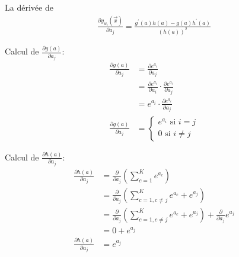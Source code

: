 La dérivée de 
\begin{equation}
\begin{split}
	\frac{\partial y_{w_i}(\overrightarrow{x})} {\partial a_j} = \frac{g^{'}(a) h(a) - g(a) h^{'}(a)} {(h(a))^2}
\end{split}
\end{equation}

Calcul de $ \frac{\partial g(a)} {\partial a_j} $:
\begin{equation}
\begin{split}
	 \frac{\partial g(a)} {\partial a_j} &= \frac{\partial e^{a_i}} {\partial a_j} \\
	 &= \frac{\partial e^{a_i}} {\partial a_i} \cdot \frac{\partial e^{a_i}} {\partial a_j} \\
	 &= e^{a_i} \cdot \frac{\partial e^{a_i}} {\partial a_j} \\
	 \frac{\partial g(a)} {\partial a_j} &= 
	 \begin{cases}
		 e^{a_i} \text{ si } i=j \\
		 0 \text{ si } i \neq j
	 \end{cases} 
\end{split}
\end{equation}

Calcul de $ \frac{\partial h(a)} {\partial a_j} $:
\begin{equation}
\begin{split}
	\frac{\partial h(a)} {\partial a_j} &= \frac{\partial}{\partial a_j} (\sum_{c=1}^K e^{a_c}) \\
	&= \frac{\partial}{\partial a_j}  \left( \sum_{c=1, c \neq j}^K e^{a_c} + e^{a_j} \right) \\
	&= \frac{\partial}{\partial a_j} \left( \sum_{c=1, c \neq j}^K e^{a_c} + e^{a_j} \right) +  \frac{\partial}{\partial a_j} e^{a_j} \\
	&= 0 + e^{a_j} \\
	\frac{\partial h(a)} {\partial a_j} &=  e^{a_j}
\end{split}
\end{equation}